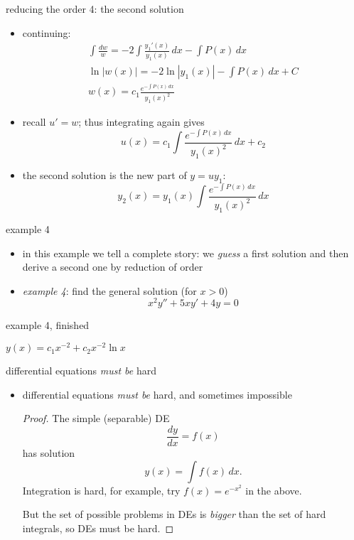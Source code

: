 \documentclass[dvipsnames]{beamer}
\begin{document}
\begin{frame}{reducing the order 4: the second solution}

\begin{itemize}
\item continuing:
\begin{gather*}
\int \frac{dw}{w} = - 2 \int \frac{y_1'(x)}{y_1(x)}\,dx - \int P(x)\,dx \\
\ln|w(x)| = - 2 \ln|y_1(x)| - \int P(x)\,dx + C \\
w(x) = c_1 \frac{e^{-\int P(x)\,dx}}{y_1(x)^2}
\end{gather*}
\item recall $u'=w$; thus integrating again gives
    $$u(x) = c_1 \int \frac{e^{-\int P(x)\,dx}}{y_1(x)^2}\,dx + c_2$$
\item the second solution is \alert{the new part of $y=uy_1$}:
    $$y_2(x) = y_1(x) \int \frac{e^{-\int P(x)\,dx}}{y_1(x)^2}\,dx$$
\end{itemize}
\end{frame}


\begin{frame}{example 4}

\begin{itemize}
\item in this example we tell a complete story: we \emph{guess} a first solution and then derive a second one by reduction of order
\item \emph{example 4}: find the general solution (for $x>0$)
    $$x^2 y'' + 5 x y' + 4 y = 0$$
\end{itemize}

\vspace{60mm}
\end{frame}


\begin{frame}{example 4, finished}

\vspace{60mm}

\hfill $y(x) = c_1 x^{-2} + c_2 x^{-2} \ln x$
\end{frame}


\begin{frame}{differential equations \emph{must be} hard}

\begin{itemize}
\item differential equations \emph{must be} hard, and sometimes impossible

\bigskip
\begin{proof} The simple (separable) DE
    $$\frac{dy}{dx} = f(x)$$
has solution
    $$y(x) = \int f(x)\,dx.$$
Integration is hard, for example, try $f(x)=e^{-x^2}$ in the above.

But the set of possible problems in DEs is \emph{bigger} than the set of hard integrals, so DEs must be hard.
\end{proof}
\end{itemize}
\end{frame}
\end{document}
